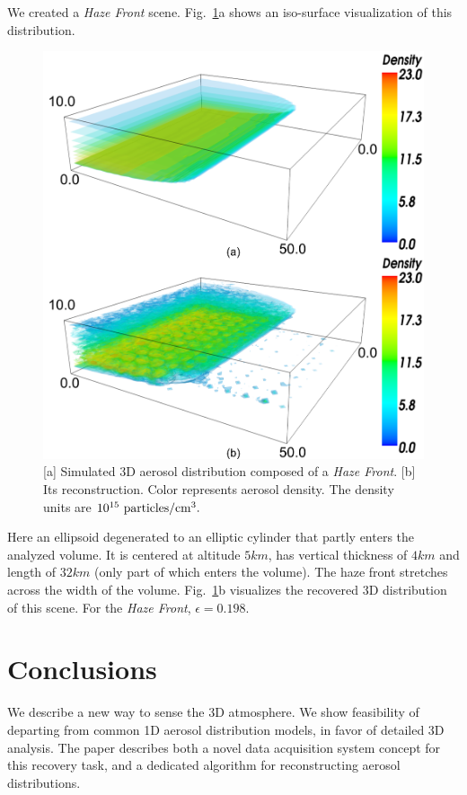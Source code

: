 \documentclass[10pt,twocolumn,letterpaper]{article}
\newcommand{\yoavcomment}[1]{}
\renewcommand{\yoavcomment}[1]{#1} %
\begin{document}
We created a {\em Haze Front} scene. Fig.~\ref{fig:simulation2}a shows an iso-surface visualization of this distribution.
\begin{figure}
  \centering
  \yoavcomment{\includegraphics[width=\columnwidth]{images/simulation2}}
  \caption{\small [a] Simulated 3D aerosol distribution composed of a {\em Haze Front}. [b] Its reconstruction. Color represents aerosol density. The density units are
  $10^{15}~{\rm particles}/{\rm cm}^3.$}
  \label{fig:simulation2}
\end{figure}
Here an ellipsoid degenerated to an elliptic cylinder that partly enters the analyzed volume. It is centered at altitude $5km$, has vertical thickness of $4km$ and length of $32km$ (only part of which enters the volume). The haze front stretches across the width of the volume.
Fig.~\ref{fig:simulation2}b visualizes the recovered 3D distribution of this scene. For the {\em Haze Front}, $\epsilon=0.198$.


\section{Conclusions}
\label{sec:conclusions}

We describe a new way to sense the 3D atmosphere. We show feasibility
of departing from common 1D aerosol distribution models, in favor of detailed 3D analysis.
The paper describes both a novel data acquisition system concept for this recovery task, and a dedicated algorithm for reconstructing aerosol distributions.
\end{document}

